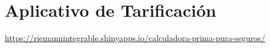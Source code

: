 \section*{Aplicativo de Tarificación}

\url{https://riemannintegrable.shinyapps.io/calculadora-prima-pura-seguros/}
